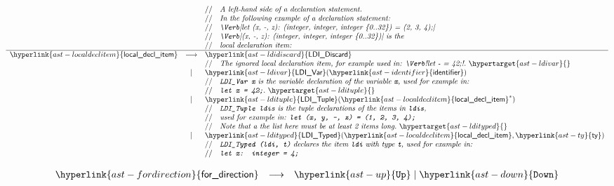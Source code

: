 \documentclass{book}
\newcommand\derives[0]{\longrightarrow}
\renewcommand\identifier[0]{\hyperlink{ast-identifier}{\textsf{identifier}}} %
\renewcommand\UP[0]{\hyperlink{ast-up}{\texttt{Up}}}
\renewcommand\DOWN[0]{\hyperlink{ast-down}{\texttt{Down}}}
\renewcommand\ty[0]{\hyperlink{ast-ty}{\textsf{ty}}}
\renewcommand\localdeclitem[0]{\hyperlink{ast-localdeclitem}{\textsf{local\_decl\_item}}}
\renewcommand\fordirection[0]{\hyperlink{ast-fordirection}{\textsf{for\_direction}}}
\renewcommand\LDIDiscard[0]{\hyperlink{ast-ldidiscard}{\textsf{LDI\_Discard}}}
\renewcommand\LDIVar[0]{\hyperlink{ast-ldivar}{\textsf{LDI\_Var}}}
\renewcommand\LDITyped[0]{\hyperlink{ast-ldityped}{\textsf{LDI\_Typed}}}
\renewcommand\LDITuple[0]{\hyperlink{ast-ldituple}{\textsf{LDI\_Tuple}}}
\begin{document}
\hypertarget{ast-localdeclitem}{} \hypertarget{ast-ldidiscard}{}
\[
\begin{array}{rcl}
  & & \ASTComment{A left-hand side of a declaration statement.}\\
  & & \ASTComment{In the following example of a declaration statement:}\\
  & & \ASTComment{\Verb|let (x, -, z): (integer, integer, integer \{0..32\}) = (2, 3, 4);|}\\
  & & \ASTComment{\Verb|(x, -, z): (integer, integer, integer \{0..32\})| is the}\\
  & & \ASTComment{local declaration item:}\\
  \hline
\localdeclitem &\derives
    & \LDIDiscard\\
  & & \ASTComment{The ignored local declaration item, for example used in: \Verb!let - = 42;!.}
  \hypertarget{ast-ldivar}{}\\
  &|& \LDIVar(\identifier)\\
  & & \ASTComment{\texttt{LDI\_Var x} is the variable declaration of the variable \texttt{x}, used for example in:}\\
  & & \ASTComment{\texttt{let x = 42;}.}
  \hypertarget{ast-ldituple}{}\\
  &|& \LDITuple(\localdeclitem^*)\\
  & & \ASTComment{\texttt{LDI\_Tuple ldis} is the tuple declarations of the items in \texttt{ldis},}\\
  & & \ASTComment{used for example in: \texttt{let (x, y, -, z) = (1, 2, 3, 4);}}\\
  & & \ASTComment{Note that a the list here must be at least 2 items long.}
  \hypertarget{ast-ldityped}{}\\
  &|& \LDITyped(\localdeclitem, \ty)\\
  & & \ASTComment{\texttt{LDI\_Typed (ldi, t)} declares the item \texttt{ldi} with type \texttt{t}, used for example in:} \\
  & & \ASTComment{\texttt{let x: integer = 4;}}
\end{array}
\]

\hypertarget{ast-fordirection}{} \hypertarget{ast-up}{} \hypertarget{ast-down}{}
\[
\begin{array}{rcl}
\fordirection &\derives& \UP \;|\; \DOWN\\
\end{array}
\]
\end{document}
